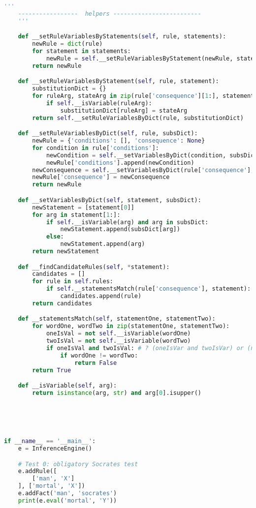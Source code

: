 \begin{lstlisting}[language=python]
    '''
    -----------------  helpers -------------------------
    '''

    def __setRuleVariablesByStatements(self, rule, statements):
        newRule = dict(rule)
        for statement in statements:
            newRule = self.__setRuleVariablesByStatement(newRule, statement)
        return newRule

    def __setRuleVariablesByStatement(self, rule, statement):
        substitutionDict = {}
        for ruleArg, stateArg in zip(rule['consequence'][1:], statement[1:]):
            if self.__isVariable(ruleArg):
                substitutionDict[ruleArg] = stateArg
        return self.__setRuleVariablesByDict(rule, substitutionDict)

    def __setRuleVariablesByDict(self, rule, subsDict):
        newRule = {'conditions': [], 'consequence': None}
        for condition in rule['conditions']:
            newCondition = self.__setVariablesByDict(condition, subsDict)
            newRule['conditions'].append(newCondition)
        newConsequence = self.__setVariablesByDict(rule['consequence'], subsDict)
        newRule['consequence'] = newConsequence
        return newRule

    def __setVariablesByDict(self, statement, subsDict):
        newStatement = [statement[0]]
        for arg in statement[1:]:
            if self.__isVariable(arg) and arg in subsDict:
                newStatement.append(subsDict[arg])
            else:
                newStatement.append(arg)
        return newStatement

    def __findCandidateRules(self, *statement):
        candidates = []
        for rule in self.rules:
            if self.__statementsMatch(rule['consequence'], statement):
                candidates.append(rule)
        return candidates

    def __statementsMatch(self, statementOne, statementTwo):
        for wordOne, wordTwo in zip(statementOne, statementTwo):
            oneIsVal = not self.__isVariable(wordOne)
            twoIsVal = not self.__isVariable(wordTwo)
            if oneIsVal and twoIsVal: # ? (oneIsVar and twoIsVar) or (not oneIsVar and not twoIsVar):
                if wordOne != wordTwo:
                    return False
        return True

    def __isVariable(self, arg):
        return isinstance(arg, str) and arg[0].isupper()





if __name__ == '__main__':
    e = InferenceEngine() 

    # Test 0: obligatory Socrates test
    e.addRule([
        ['man', 'X']
    ], ['mortal', 'X'])
    e.addFact('man', 'socrates')
    print(e.eval('mortal', 'Y'))
\end{lstlisting}
